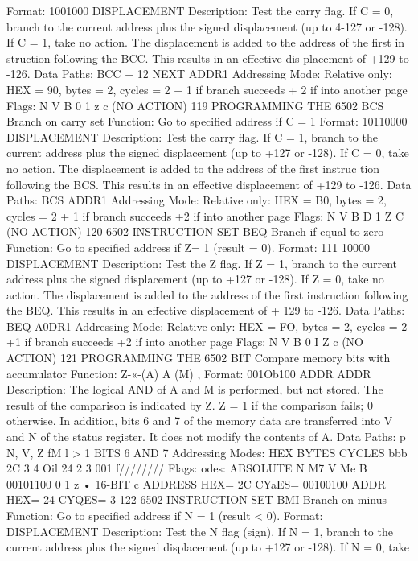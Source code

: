 \documentclass{book}
\begin{document}
Format:
1001000 DISPLACEMENT
Description:
Test the carry flag. If C = 0, branch to the current address plus
the signed displacement (up to 4-127 or -128). If C = 1, take no
action. The displacement is added to the address of the first in
struction following the BCC. This results in an effective dis
placement of +129 to -126.
Data Paths:
BCC
+ 12
NEXT ADDR1
Addressing Mode:
Relative only:
HEX = 90, bytes = 2, cycles = 2 + 1 if branch succeeds
+ 2 if into another page
Flags:
N V B 0 1 z c
(NO ACTION)
119
PROGRAMMING THE 6502
BCS Branch on carry set
Function:
Go to specified address if C = 1
Format: 10110000 DISPLACEMENT
Description:
Test the carry flag. If C = 1, branch to the current address plus
the signed displacement (up to +127 or -128). If C = 0, take no
action. The displacement is added to the address of the first instruc
tion following the BCS. This results in an effective displacement of
+129 to -126.
Data Paths:
BCS
ADDR1
Addressing Mode:
Relative only:
HEX = B0, bytes = 2, cycles = 2 + 1 if branch succeeds
+2 if into another page
Flags:
N V B D 1 Z C
(NO ACTION)
120
6502 INSTRUCTION SET
BEQ Branch if equal to zero
Function:
Go to specified address if Z= 1 (result = 0).
Format: 111 10000 DISPLACEMENT
Description:
Test the Z flag. If Z = 1, branch to the current address plus the
signed displacement (up to +127 or -128). If Z = 0, take no
action.
The displacement is added to the address of the first instruction
following the BEQ. This results in an effective displacement of
+ 129 to -126.
Data Paths:
BEQ
A0DR1
Addressing Mode:
Relative only:
HEX = FO, bytes = 2, cycles = 2 +1 if branch succeeds
+2 if into another page
Flags:
N V B 0 I Z c
(NO ACTION)
121
PROGRAMMING THE 6502
BIT Compare memory bits with accumulator
Function:
Z-«-(A) A (M) ,
Format: 001Ob100 ADDR ADDR
Description:
The logical AND of A and M is performed, but not stored. The result
of the comparison is indicated by Z. Z = 1 if the comparison fails; 0
otherwise. In addition, bits 6 and 7 of the memory data are transferred
into V and N of the status register. It does not modify the contents of A.
Data Paths:
p
N, V, Z
fM
l \V
> 1
BITS 6 AND 7
Addressing Modes:
HEX
BYTES
CYCLES
bbb
2C
3
4
Oil
24
2
3
001
f////////
Flags:
odes:
ABSOLUTE
N
M7
V
Me
B
00101100
0 1 z
•
16-BIT
c
ADDRESS
HEX= 2C CYaES=
00100100 ADDR
HEX= 24 CYQES= 3
122
6502 INSTRUCTION SET
BMI Branch on minus
Function:
Go to specified address if N = 1 (result < 0).
Format: DISPLACEMENT
Description:
Test the N flag (sign). If N = 1, branch to the current address
plus the signed displacement (up to +127 or -128). If N = 0, take
\end{document}
